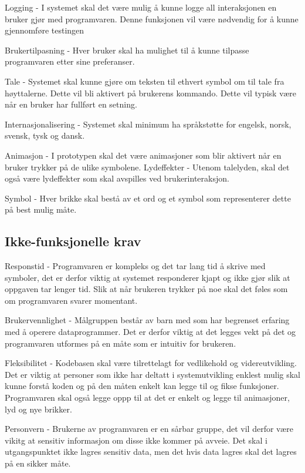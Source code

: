  
Logging - I systemet skal det være mulig å kunne logge all interaksjonen en bruker gjør med programvaren. Denne funksjonen vil være nødvendig for å kunne gjennomføre testingen 
 
 
Brukertilpasning - Hver bruker skal ha mulighet til å kunne tilpasse programvaren etter sine preferanser.  
  
Tale - Systemet skal kunne gjøre om teksten til ethvert symbol om til tale fra høyttalerne. Dette vil bli aktivert på brukerens kommando. Dette vil typisk være når en bruker har fullført en setning. 
  
Internasjonalisering - Systemet skal minimum ha språkstøtte for engelsk, norsk, svensk, tysk og dansk. 
 
Animasjon - I prototypen skal det være animasjoner som blir aktivert når en bruker trykker på de ulike symbolene.  
Lydeffekter - Utenom talelyden, skal det også være lydeffekter som skal avspilles ved brukerinteraksjon.  
 
Symbol - Hver brikke skal bestå av et ord og et symbol som representerer dette på best mulig måte. 
 
 
\subsection{Ikke-funksjonelle krav} 
 
 
Responstid -  Programvaren er kompleks og det tar lang tid å skrive med symboler, det er derfor viktig at systemet responderer kjapt og ikke gjør slik at oppgaven tar lenger tid. Slik at når brukeren trykker på noe skal det føles som om programvaren svarer momentant. 
 
 
Brukervennlighet - Målgruppen består av barn med som har begrenset erfaring med å operere dataprogrammer. Det er derfor viktig at det legges vekt på det og programvaren utformes på en måte som er intuitiv for brukeren.   
 
 
Fleksibilitet - Kodebasen skal være tilrettelagt for vedlikehold og videreutvikling. Det er viktig at personer som ikke har deltatt i systemutvikling enklest mulig skal kunne forstå koden og på den måten enkelt kan legge til og fikse funksjoner. Programvaren skal også legge oppp til at det er enkelt og legge til animasjoner, lyd og nye brikker. 
 
Personvern - Brukerne av programvaren er en sårbar gruppe, det vil derfor være vikitg at sensitiv informasjon om disse ikke kommer på avveie. Det skal i utgangspunktet ikke lagres sensitiv data, men det hvis data lagres skal det lagres på en sikker måte. 
 
